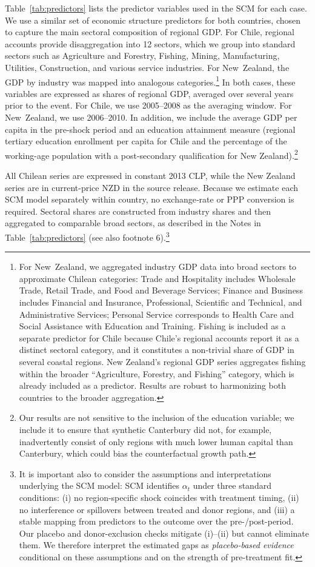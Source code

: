 \documentclass[12pt]{article}
\begin{document}
Table \ref{tab:predictors} lists the predictor variables used in the SCM for each case. We use a similar set of economic structure predictors for both countries, chosen to capture the main sectoral composition of regional GDP. For Chile, regional accounts provide disaggregation into 12 sectors, which we group into standard sectors such as Agriculture and Forestry, Fishing, Mining, Manufacturing, Utilities, Construction, and various service industries. For New Zealand, the GDP by industry was mapped into analogous categories.\footnote{For New Zealand, we aggregated industry GDP data into broad sectors to approximate Chilean categories: Trade and Hospitality includes Wholesale Trade, Retail Trade, and Food and Beverage Services; Finance and Business includes Financial and Insurance, Professional, Scientific and Technical, and Administrative Services; Personal Service corresponds to Health Care and Social Assistance with Education and Training. Fishing is included as a separate predictor for Chile because Chile's regional accounts report it as a distinct sectoral category, and it constitutes a non-trivial share of GDP in several coastal regions. New Zealand's regional GDP series aggregates fishing within the broader ``Agriculture, Forestry, and Fishing'' category, which is already included as a predictor. Results are robust to harmonizing both countries to the broader aggregation.} In both cases, these variables are expressed as shares of regional GDP, averaged over several years prior to the event. For Chile, we use 2005–2008 as the averaging window. For New Zealand, we use 2006–2010. In addition, we include the average GDP per capita in the pre-shock period and an education attainment measure (regional tertiary education enrollment per capita for Chile and the percentage of the working-age population with a post-secondary qualification for New Zealand).\footnote{Our results are not sensitive to the inclusion of the education variable; we include it to ensure that synthetic Canterbury did not, for example, inadvertently consist of only regions with much lower human capital than Canterbury, which could bias the counterfactual growth path.} 

All Chilean series are expressed in constant 2013 CLP, while the New Zealand series are in current-price NZD in the source release. Because we estimate each SCM model separately within country, no exchange‑rate or PPP conversion is required. Sectoral shares are constructed from industry shares and then aggregated to comparable broad sectors, as described in the Notes in Table~\ref{tab:predictors} (see also footnote 6).\footnote{It is important also to consider the assumptions and interpretations underlying the SCM model: SCM identifies $\alpha_t$ under three standard conditions: (i) no region-specific shock coincides with treatment timing, (ii) no interference or spillovers between treated and donor regions, and (iii) a stable mapping from predictors to the outcome over the pre-/post-period. Our placebo and donor-exclusion checks mitigate (i)–(ii) but cannot eliminate them. We therefore interpret the estimated gaps as \emph{placebo-based evidence} conditional on these assumptions and on the strength of pre-treatment fit.}
\end{document}
